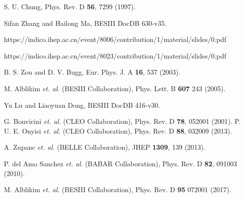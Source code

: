 \begin{thebibliography}{99}
     S. U. Chung, Phys. Rev. D \textbf{56}, 7299 (1997).

     Sifan Zhang and Hailong Ma, BESIII DocDB 630-v35.

        https://indico.ihep.ac.cn/event/8006/contribution/1/material/slides/0.pdf

        https://indico.ihep.ac.cn/event/8023/contribution/1/material/slides/0.pdf

        B. S. Zou and D. V. Bugg, 
        Eur. Phys. J. A \textbf{16}, 537 (2003).

        M. Alblikim {\it et. al.}  (BESIII Collaboration),
        Phys. Lett. B \textbf{607} 243 (2005).

        Yu Lu and Liaoyuan Dong, 
        BESIII DocDB 416-v30.

        G. Bonvicini {\it et. al.}  (CLEO Collaboration),
        Phys. Rev. D \textbf{78}, 052001 (2001).
        P. U. E. Onyisi {\it et. al.}  (CLEO Collaboration),
        Phys. Rev. D \textbf{88}, 032009 (2013).

        A. Zupanc {\it et. al.}  (BELLE Collaboration),
        JHEP \textbf{1309}, 139 (2013).

        P. del Amo Sanchez {\it et. al.}  (BABAR Collaboration),
        Phys. Rev. D \textbf{82}, 091003 (2010).


        M. Alblikim {\it et. al.}  (BESIII Collaboration),
        Phys. Rev. D \textbf{95} 072001 (2017).


\end{thebibliography}
